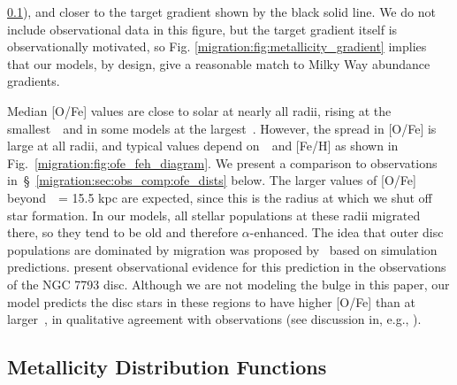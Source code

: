 \ref{migration:sec:obs_comp:mdfs}), and closer to the target gradient shown by the black 
solid line. We do not include observational data in this figure, but the target 
gradient itself is observationally motivated, so Fig. 
\ref{migration:fig:metallicity_gradient} implies that our models, by design, give a 
reasonable match to Milky Way abundance gradients. 
\par 
Median [O/Fe] values are close to solar at nearly all radii, rising at the 
smallest~\rgal~and in some models at the largest~\rgal. However, the spread in 
[O/Fe] is large at all radii, and typical values depend on~\absz~and [Fe/H] as 
shown in Fig.~\ref{migration:fig:ofe_feh_diagram}. 
We present a comparison to observations in~\S~\ref{migration:sec:obs_comp:ofe_dists} 
below. 
The larger values of [O/Fe] beyond~\rgal~= 15.5 kpc are expected, since this is 
the radius at which we shut off star formation. In our models, all stellar 
populations at these radii migrated there, so they tend to be old and therefore 
$\alpha$-enhanced. 
The idea that outer disc populations are dominated by migration was proposed 
by~\citet{Roskar2008b} based on simulation predictions. 
\citet{RadburnSmith2012} present observational evidence for this prediction in 
the observations of the NGC 7793 disc. 
Although we are not modeling the bulge in this paper, our model predicts the 
disc stars in these regions to have higher [O/Fe] than at larger~\rgal, in 
qualitative agreement with observations (see discussion in, e.g., 
\citealp{Duong2019, Griffith2021a}). 

\subsection{Metallicity Distribution Functions} 
\label{migration:sec:obs_comp:mdfs} 

